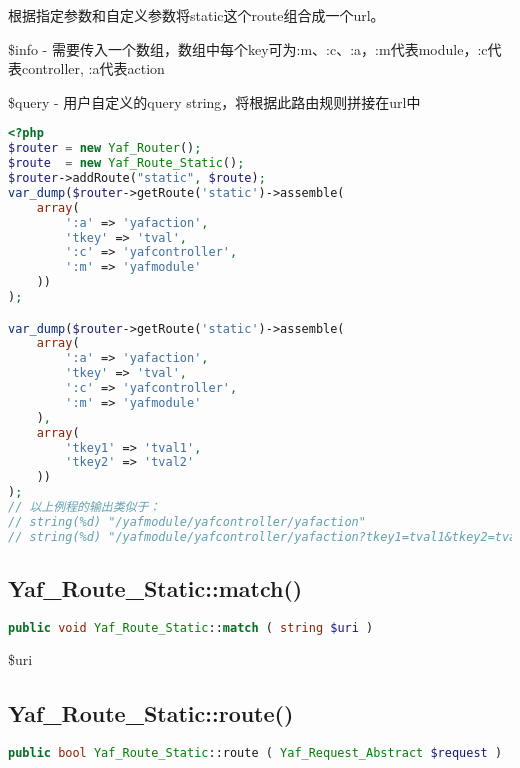 根据指定参数和自定义参数将static这个route组合成一个url。

\begin{compactitem}
\item \$info - 需要传入一个数组，数组中每个key可为:m、:c、:a，:m代表module，:c代表controller, :a代表action

\item \$query - 用户自定义的query string，将根据此路由规则拼接在url中

\end{compactitem}



\begin{lstlisting}[language=PHP]
<?php
$router = new Yaf_Router();
$route  = new Yaf_Route_Static();
$router->addRoute("static", $route);
var_dump($router->getRoute('static')->assemble(
    array(
        ':a' => 'yafaction',
        'tkey' => 'tval',
        ':c' => 'yafcontroller',
        ':m' => 'yafmodule'
    ))
);

var_dump($router->getRoute('static')->assemble(
    array(
        ':a' => 'yafaction',
        'tkey' => 'tval',
        ':c' => 'yafcontroller',
        ':m' => 'yafmodule'
    ),
    array(
        'tkey1' => 'tval1',
        'tkey2' => 'tval2'
    ))
);
// 以上例程的输出类似于：
// string(%d) "/yafmodule/yafcontroller/yafaction"
// string(%d) "/yafmodule/yafcontroller/yafaction?tkey1=tval1&tkey2=tval2"
\end{lstlisting}

\subsection{Yaf\_Route\_Static::match()}


\begin{lstlisting}[language=PHP]
public void Yaf_Route_Static::match ( string $uri )
\end{lstlisting}

\begin{compactitem}
\item \$uri
\end{compactitem}

\subsection{Yaf\_Route\_Static::route()}



\begin{lstlisting}[language=PHP]
public bool Yaf_Route_Static::route ( Yaf_Request_Abstract $request )
\end{lstlisting}

